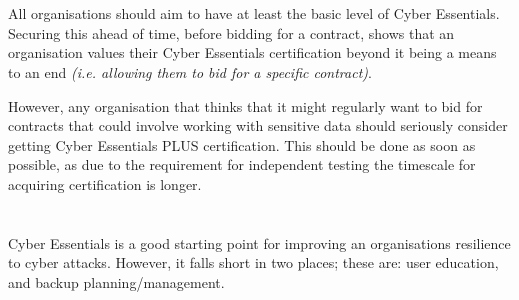 \documentclass[12pt]{article}
\begin{document}
\section*{}
All organisations should aim to have at least the basic level of Cyber Essentials. Securing this ahead of time, before bidding for a contract, shows that an organisation values their Cyber Essentials certification beyond it being a means to an end \textit{(i.e. allowing them to bid for a specific contract)}.

However, any organisation that thinks that it might regularly want to bid for contracts that could involve working with sensitive data should seriously consider getting Cyber Essentials PLUS certification. This should be done as soon as possible, as due to the requirement for independent testing the timescale for acquiring certification is longer.


\section*{}
Cyber Essentials is a good starting point for improving an organisations resilience to cyber attacks. However, it falls short in two places; these are: user education, and backup planning/management.
\end{document}
